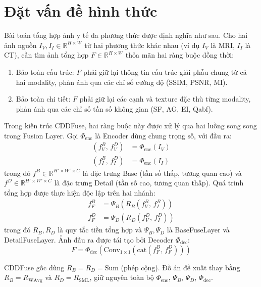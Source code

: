 \section{Đặt vấn đề hình thức}
\label{sec:formal-problem}

Bài toán tổng hợp ảnh y tế đa phương thức được định nghĩa như sau. Cho hai ảnh nguồn $I_V, I_I \in \mathbb{R}^{H \times W}$ từ hai phương thức khác nhau (ví dụ $I_V$ là MRI, $I_I$ là CT), cần tìm ảnh tổng hợp $F \in \mathbb{R}^{H \times W}$ thỏa mãn hai ràng buộc đồng thời:
\begin{enumerate}\itemsep2pt
    \item Bảo toàn cấu trúc: $F$ phải giữ lại thông tin cấu trúc giải phẫu chung từ cả hai modality, phản ánh qua các chỉ số cường độ (SSIM, PSNR, MI).
    \item Bảo toàn chi tiết: $F$ phải giữ lại các cạnh và texture đặc thù từng modality, phản ánh qua các chỉ số tần số không gian (SF, AG, EI, Qabf).
\end{enumerate}

Trong kiến trúc CDDFuse, hai ràng buộc này được xử lý qua hai luồng song song trong Fusion Layer. Gọi $\Phi_{\mathrm{enc}}$ là Encoder dùng chung trọng số, với đầu ra:
\begin{align}
(f_V^B,\, f_V^D) &= \Phi_{\mathrm{enc}}(I_V) \\
(f_I^B,\, f_I^D) &= \Phi_{\mathrm{enc}}(I_I)
\end{align}
trong đó $f^B \in \mathbb{R}^{H' \times W' \times C}$ là đặc trưng Base (tần số thấp, tương quan cao) và $f^D \in \mathbb{R}^{H' \times W' \times C}$ là đặc trưng Detail (tần số cao, tương quan thấp). Quá trình tổng hợp được thực hiện độc lập trên hai nhánh:
\begin{align}
f_F^B &= \Psi_B\!\left(R_B(f_V^B,\, f_I^B)\right) \\
f_F^D &= \Psi_D\!\left(R_D(f_V^D,\, f_I^D)\right)
\end{align}
trong đó $R_B, R_D$ là quy tắc tiền tổng hợp và $\Psi_B, \Psi_D$ là BaseFuseLayer và DetailFuseLayer. Ảnh đầu ra được tái tạo bởi Decoder $\Phi_{\mathrm{dec}}$:
\begin{equation}
F = \Phi_{\mathrm{dec}}\!\left(\mathrm{Conv}_{1\times1}\!\left(\mathrm{cat}(f_F^B,\, f_F^D)\right)\right)
\end{equation}

CDDFuse gốc dùng $R_B = R_D = \text{Sum}$ (phép cộng). Đồ án đề xuất thay bằng $R_B = R_{\mathrm{WAvg}}$ và $R_D = R_{\mathrm{SML}}$, giữ nguyên toàn bộ $\Phi_{\mathrm{enc}}$, $\Psi_B$, $\Psi_D$, $\Phi_{\mathrm{dec}}$.

